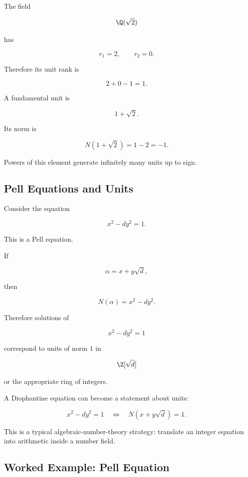 The field

\[ \Q(\sqrt2) \]

has

\[ r_1=2,\qquad r_2=0. \]

Therefore its unit rank is

\[ 2+0-1=1. \]

A fundamental unit is

\[ 1+\sqrt2. \]

Its norm is

\[ N(1+\sqrt2)=1-2=-1. \]

Powers of this element generate infinitely many units up to sign.

\subsection{Pell Equations and Units}
\label{subsec:pell-equations-units}

Consider the equation

\[ x^2-dy^2=1. \]

This is a Pell equation.

If

\[ \alpha=x+y\sqrt d, \]

then

\[ N(\alpha)=x^2-dy^2. \]

Therefore solutions of

\[ x^2-dy^2=1 \]

correspond to units of norm \(1\) in

\[ \Z[\sqrt d] \]

or the appropriate ring of integers.

\begin{conceptbox}
A Diophantine equation can become a statement about units:

\[
\boxed{
x^2-dy^2=1
\quad\Longleftrightarrow\quad
N(x+y\sqrt d)=1.
}
\]

This is a typical algebraic-number-theory strategy:
translate an integer equation into arithmetic inside a number field.
\end{conceptbox}

\subsection{Worked Example: Pell Equation}
\label{subsec:worked-pell-equation}

